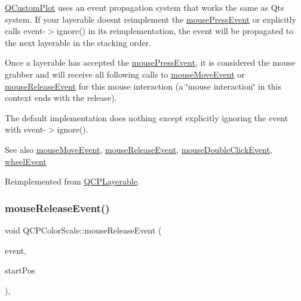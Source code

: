 \mbox{\hyperlink{class_q_custom_plot}{Q\+Custom\+Plot}} uses an event propagation system that works the same as Qt\textquotesingle{}s system. If your layerable doesn\textquotesingle{}t reimplement the \mbox{\hyperlink{class_q_c_p_color_scale_a91f633b97ffcd57fdf8cd814974c20e6}{mouse\+Press\+Event}} or explicitly calls {\ttfamily event-\/$>$ignore()} in its reimplementation, the event will be propagated to the next layerable in the stacking order.

Once a layerable has accepted the \mbox{\hyperlink{class_q_c_p_color_scale_a91f633b97ffcd57fdf8cd814974c20e6}{mouse\+Press\+Event}}, it is considered the mouse grabber and will receive all following calls to \mbox{\hyperlink{class_q_c_p_color_scale_a3b2bd79725aefaf2630fc76e90939442}{mouse\+Move\+Event}} or \mbox{\hyperlink{class_q_c_p_color_scale_a6a35dd39ab4e5cb2d7b29ebb4d5b61b0}{mouse\+Release\+Event}} for this mouse interaction (a \char`\"{}mouse interaction\char`\"{} in this context ends with the release).

The default implementation does nothing except explicitly ignoring the event with {\ttfamily event-\/$>$ignore()}.

\begin{DoxySeeAlso}{See also}
\mbox{\hyperlink{class_q_c_p_color_scale_a3b2bd79725aefaf2630fc76e90939442}{mouse\+Move\+Event}}, \mbox{\hyperlink{class_q_c_p_color_scale_a6a35dd39ab4e5cb2d7b29ebb4d5b61b0}{mouse\+Release\+Event}}, \mbox{\hyperlink{class_q_c_p_layerable_a4171e2e823aca242dd0279f00ed2de81}{mouse\+Double\+Click\+Event}}, \mbox{\hyperlink{class_q_c_p_color_scale_a63cf19be184f6670c9495ad3a9a1baeb}{wheel\+Event}} 
\end{DoxySeeAlso}


Reimplemented from \mbox{\hyperlink{class_q_c_p_layerable_af6567604818db90f4fd52822f8bc8376}{Q\+C\+P\+Layerable}}.

\mbox{\label{class_q_c_p_color_scale_a6a35dd39ab4e5cb2d7b29ebb4d5b61b0}} 
\subsubsection{\texorpdfstring{mouseReleaseEvent()}{mouseReleaseEvent()}}
{\footnotesize\ttfamily void Q\+C\+P\+Color\+Scale\+::mouse\+Release\+Event (\begin{DoxyParamCaption}\item[{Q\+Mouse\+Event $\ast$}]{event,  }\item[{const Q\+PointF \&}]{start\+Pos }\end{DoxyParamCaption})\hspace{0.3cm}{\ttfamily [protected]}, {\ttfamily [virtual]}}

